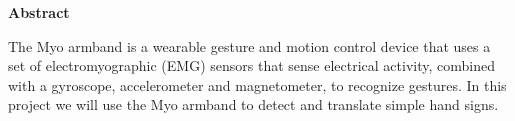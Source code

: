 \vspace*{\fill}
{\centering\huge\bfseries Abstract \par}
The Myo armband is a wearable gesture and motion control device that uses a set of electromyographic (EMG) sensors that sense electrical activity, combined with a gyroscope, accelerometer and magnetometer, to recognize gestures. In this project we will use the Myo armband to detect and translate simple hand signs.
\vspace*{\fill}